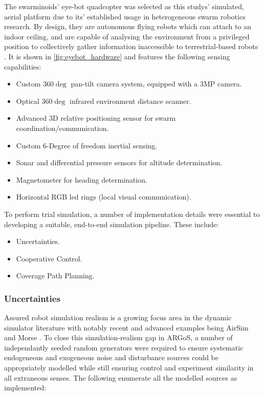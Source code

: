 \documentclass{report}
\begin{document}
The swarminoids' \cite{Dorigo2013} eye-bot quadcopter was selected as this studys' simulated, aerial platform due to its' established usage in heterogeneous swarm robotics research. By design, they are autonomous flying robots which can attach to an indoor ceiling, and are capable of analysing the environment from a privileged position to collectively gather information inaccessible to terrestrial-based robots \cite{Dorigo2013}. It is shown in \ref{fig:eyebot_hardware} and features the following sensing capabilities:
\begin{itemize}
    \item Custom $360\deg$ pan-tilt camera system, equipped with a 3MP camera.
    \item Optical $360\deg$ infrared environment distance scanner.
    \item Advanced 3D relative positioning sensor for swarm coordination/communication.
    \item Custom 6-Degree of freedom inertial sensing.
    \item Sonar and differential pressure sensors for altitude determination.
    \item Magnetometer for heading determination.
    \item Horizontal RGB led rings (local visual communication).
\end{itemize}

To perform trial simulation, a number of implementation details were essential to developing a suitable, end-to-end simulation pipeline. These include:
\begin{itemize}
	\item Uncertainties.
	\item Cooperative Control.
	\item Coverage Path Planning.
\end{itemize}

\subsubsection{Uncertainties}
Assured robot simulation realism is a growing focus area \cite{Taylor2014} in the dynamic simulator literature with notably recent and advanced examples being AirSim \cite{Shah2018} and Morse \cite{Morse2011} \cite{Lemaignan2014}. To close this simulation-realism gap in ARGoS, a number of independantly seeded random generators were required to ensure systematic endogeneous and exogeneous noise and disturbance sources could be appropriately modelled while still ensuring control and experiment similarity in all extraneous senses. The following enumerate all the modelled sources as implemented:
\end{document}
